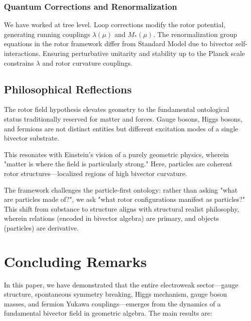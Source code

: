 \documentclass[11pt,a4paper]{article}
\theoremstyle{definition}
\theoremstyle{plain}
\theoremstyle{remark}
\begin{document}
\subsubsection{Quantum Corrections and Renormalization}

We have worked at tree level. Loop corrections modify the rotor potential, generating running couplings $\lambda(\mu)$ and $M_\ast(\mu)$. The renormalization group equations in the rotor framework differ from Standard Model due to bivector self-interactions. Ensuring perturbative unitarity and stability up to the Planck scale constrains $\lambda$ and rotor curvature couplings.

\subsection{Philosophical Reflections}

The rotor field hypothesis elevates geometry to the fundamental ontological status traditionally reserved for matter and forces. Gauge bosons, Higgs bosons, and fermions are not distinct entities but different excitation modes of a single bivector substrate.

This resonates with Einstein's vision of a purely geometric physics, wherein "matter is where the field is particularly strong." Here, particles are coherent rotor structures---localized regions of high bivector curvature.

The framework challenges the particle-first ontology: rather than asking "what are particles made of?", we ask "what rotor configurations manifest as particles?" This shift from substance to structure aligns with structural realist philosophy, wherein relations (encoded in bivector algebra) are primary, and objects (particles) are derivative.

\vspace{1em}

\section{Concluding Remarks}\label{sec:conclusion}

In this paper, we have demonstrated that the entire electroweak sector---gauge structure, spontaneous symmetry breaking, Higgs mechanism, gauge boson masses, and fermion Yukawa couplings---emerges from the dynamics of a fundamental bivector field in geometric algebra. The main results are:
\end{document}
